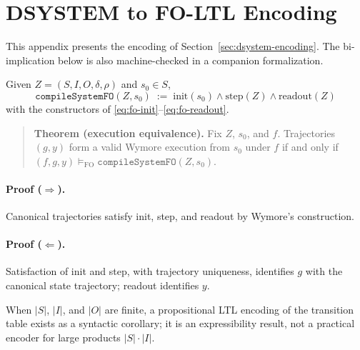 \section{DSYSTEM to FO-LTL Encoding}
\label{app:encoding}

This appendix presents the encoding of Section~\ref{sec:dsystem-encoding}. The bi-implication below is also machine-checked in a companion formalization.

Given $Z=(S,I,O,\delta,\rho)$ and $s_0\in S$,
\[
  \texttt{compileSystemFO}(Z,s_0) \;:=\; \text{init}(s_0)\wedge\text{step}(Z)\wedge\text{readout}(Z)
\]
with the constructors of \eqref{eq:fo-init}--\eqref{eq:fo-readout}.

\begin{quote}
\textbf{Theorem (execution equivalence).} Fix $Z$, $s_0$, and $f$. Trajectories $(g,y)$ form a valid Wymore execution from $s_0$ under $f$ if and only if $(f,g,y)\models_{\mathrm{FO}}\texttt{compileSystemFO}(Z,s_0)$.
\end{quote}

\paragraph{Proof ($\Rightarrow$).} Canonical trajectories satisfy init, step, and readout by Wymore's construction.

\paragraph{Proof ($\Leftarrow$).} Satisfaction of init and step, with trajectory uniqueness, identifies $g$ with the canonical state trajectory; readout identifies $y$.

When $|S|$, $|I|$, and $|O|$ are finite, a propositional LTL encoding of the transition table exists as a syntactic corollary; it is an expressibility result, not a practical encoder for large products $|S|\cdot|I|$.
